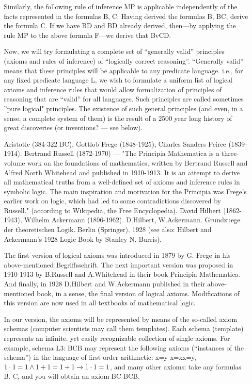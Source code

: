 Similarly, the following rule of inference MP is applicable independently of the facts represented in the
formulas B, C:
Having derived the formulas B, B\IMPLIES C, derive the formula C.
If we have B\IMPLIES D and B\IMPLIES D already derived, then---by applying the rule MP to the above formula F---we derive that BvC\IMPLIES D.

Now, we will try formulating a complete set of ``generally valid'' principles (axioms and rules of inference) of ``logically correct reasoning''. ``Generally valid'' means that these principles will be applicable to any predicate language. i.e., for any fixed predicate language L, we wish to formulate a uniform list of logical axioms and inference rules that would allow formalization of principles of reasoning that are ``valid'' for all languages. Such principles are called sometimes ''pure logical" principles. The existence of such general principles (and even, in a sense, a complete system of them) is the result of a 2500 year long history of great discoveries (or inventions? --- see below).

Aristotle (384-322 BC), Gottlob Frege (1848-1925), Charles Sanders Peirce (1839-1914).
Bertrand Russell (1872-1970) --- "The Principia Mathematica is a three-volume work on the foundations of mathematics,
written by Bertrand Russell and Alfred North Whitehead and published in 1910-1913. It is an attempt to derive all
mathematical truths from a well-defined set of axioms and inference rules in symbolic logic. The main inspiration and
motivation for the Principia was Frege's earlier work on logic, which had led to some contradictions discovered by Russell."
(according to Wikipedia, the Free Encyclopedia).
David Hilbert (1862-1943), Wilhelm Ackermann (1896-1962).
D.Hilbert, W.Ackermann. Grundzuege der theoretischen Logik. Berlin (Springer), 1928 (see also: Hilbert and Ackermann's
1928 Logic Book by Stanley N. Burris).

The first version of logical axioms was introduced in 1879 by G. Frege in his above-mentioned
Begriffsschrift. The next important version was proposed in 1910-1913 by B.Russell and A.Whitehead in
their book Principia Mathematica. And finally, in 1928 D.Hilbert and W.Ackermann published in their
above-mentioned book, in a sense, the final version of logical axioms. Modifications of this version are
now used in all textbooks of mathematical logic.

In our version, the axioms will be represented by means of the so-called axiom schemas (computer
scientists may call them templates). Each schema (template) represents an infinite, yet easily recognizable
collection of single axioms. For example, schema L3: B\AND C\IMPLIES B may represent the following axioms
(``instances of the schema'') in the language of first-order arithmetic:
x=y \AND  x=x\IMPLIES x=y,
\(1\cdot 1=1 \wedge  1+1=1+1\rightarrow 1\cdot 1=1\),
and many other axioms: take any formulas B, C, and you will obtain an axiom B\AND C B\AND C\IMPLIES B.

